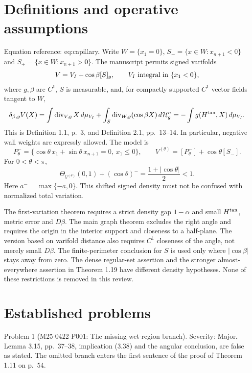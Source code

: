 \documentclass[10pt]{article}
\begin{document}
\section*{Definitions and operative assumptions}
Equation reference: eq:capillary. Write \(W=\{x_1=0\}\), \(S_-=\{x\in W:x_{n+1}<0\}\) and \(S_+=\{x\in W:x_{n+1}>0\}\). The manuscript permits signed varifolds \[V=V_I+\cos\beta[S]_g,\qquad V_I\ \hbox{integral in }\{x_1<0\},\] where \(g,\beta\) are \(C^1\), \(S\) is measurable, and, for compactly supported \(C^1\) vector fields tangent to \(W\), \[
 \delta_{\beta,g}V(X)
 =\int\operatorname{div}_{V,g}X\,d\mu_{V_I}
  +\int_S\operatorname{div}_{W,g}(\cos\beta X)\,d\mathcal H_g^n
 =-\int g(H^{\rm tan},X)\,d\mu_{V_I}.\] This is Definition 1.1, p. 3, and Definition 2.1, pp. 13–14. In particular, negative wall weights are expressly allowed. The model is \[P_\theta^-=\{\cos\theta\,x_1+\sin\theta\,x_{n+1}=0,\ x_1\leq0\},
 \qquad V^{(\theta)}=[P_\theta^-]+\cos\theta[S_-].\] For \(0<\theta<\pi\), \[\Theta_{V^{(\theta)}}(0,1)+(\cos\theta)^-
   =\frac{1+|\cos\theta|}{2}<1.\] Here \(a^-=\max\{-a,0\}\). This shifted signed density must not be confused with normalized total variation.\par
The first-variation theorem requires a strict density gap \(1-\alpha\) and small \(H^{\rm tan}\), metric error and \(D\beta\). The main graph theorem excludes the right angle and requires the origin in the interior support and closeness to a half-plane. The version based on varifold distance also requires \(C^1\) closeness of the angle, not merely small \(D\beta\). The finite-perimeter conclusion for \(S\) is used only where \(|\cos\beta|\) stays away from zero. The dense regular-set assertion and the stronger almost-everywhere assertion in Theorem 1.19 have different density hypotheses. None of these restrictions is removed in this review.\par
\section*{Established problems}
Problem 1 (M25-0422-P001: The missing wet-region branch).  Severity: Major. Lemma 3.15, pp. 37–38, implication (3.38) and the angular conclusion, are false as stated. The omitted branch enters the first sentence of the proof of Theorem 1.11 on p. 54.\par
\end{document}
